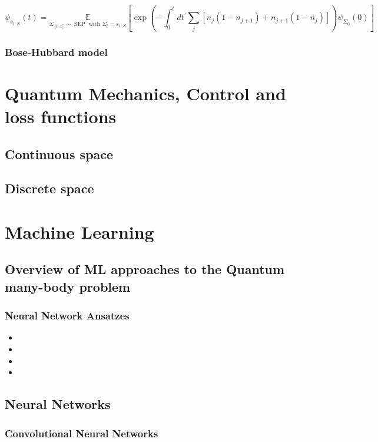 \begin{equation}
	\psi_{s_{1: N}}(t)=\underset{\Sigma_{[0, t]} \sim \operatorname{SEP} \text{ with } \Sigma_{t}=s_{1: N}}{\mathbb{E}}
\left[\exp \left(-\int_{0}^{t} d t^{\prime} \sum_{j}\left[n_{j}\left(1-n_{j+1}\right)+n_{j+1}\left(1-n_{j}\right)\right]\right) \psi_{\Sigma_{0}}(0)\right]
\end{equation}

\subsubsection{Bose-Hubbard model}

\newpage
\section{Quantum Mechanics, Control and loss functions}

\subsection{Continuous space}

\subsection{Discrete space}



\newpage
\section{Machine Learning}
\label{sec:ml}

\subsection{Overview of ML approaches to the Quantum many-body problem}
\label{subsec:ml-overview}

\subsubsection{Neural Network Ansatzes}
\begin{itemize}
	\item
	\item
	\item
	\item
\end{itemize}

\subsection{Neural Networks}

\subsubsection{Convolutional Neural Networks}
\label{subsubsec:ml-cnn}


